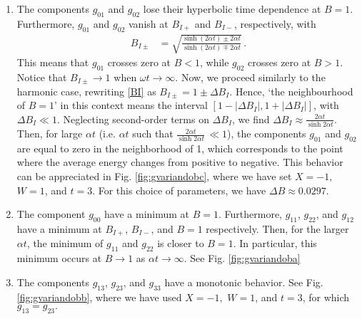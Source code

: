 \documentclass[12pt]{iopart}
\begin{document}
\begin{enumerate}
 \item The components $g_{01}$ and $g_{02}$ lose their hyperbolic time dependence at $B=1$. Furthermore, $g_{01}$ and $g_{02}$ vanish at $B_{I+}$ and $B_{I-}$, respectively, with
    \begin{align} 
    \label{BI}
    B_{I\pm}&=\sqrt{\frac{\sinh\left(2 \alpha t\right)\pm 2\alpha t} {\sinh\left(2 \alpha t\right)\mp 2 \alpha t}}\,.
\end{align}
This means that $g_{01}$ crosses zero at $B<1$, while $g_{02}$ crosses zero at $B>1$. Notice that $B_{I\pm}\to 1$ when $\omega t\to \infty$. Now, we proceed similarly to the harmonic case, rewriting \eqref{BI} as $ B_{I\pm}=1\pm \Delta B_I$. Hence, `the neighbourhood of $B=1$' in this context means the interval $[ 1-|\Delta B_I|,1+|\Delta B_I| ]$, with $\Delta B_I\ll 1$. Neglecting second-order terms on $\Delta B_I$, we find  $\Delta B_I \approx \tfrac{ 2\alpha t}{\sinh 2\alpha t}$. Then, for large $\alpha t$ (i.e. $\alpha t$ such that $\tfrac{ 2\alpha t}{\sinh 2\alpha t} \,\ll 1$), the components $g_{01}$ and $g_{02}$ are equal to zero in the neighborhood of 1, which corresponds to the point where the average energy changes from positive to negative.  This behavior can be appreciated in Fig. \ref{fig:gvariandobc}, where we have set $X=-1,$ $W=1$, and $t=3$.  For this choice of parameters, we have $\Delta B \approx 0.0297.$
  \item  The component $g_{00}$ have a minimum at $B=1$. Furthermore, $g_{11}$, $g_{22}$, and $g_{12}$ have a minimum at $B_{I+}$, $B_{I-}$, and $B=1$ respectively. Then, for the larger $ \alpha t$, the minimum of $g_{11}$ and $g_{22}$ is closer to $B=1$. In particular, this minimum occurs at $B\to 1$ as $\alpha t \to \infty$. See  Fig. \ref{fig:gvariandoba}
    
   \item  The components $g_{13}$, $g_{23}$, and $g_{33}$ have a monotonic behavior. See Fig. \ref{fig:gvariandobb}, where we have used $X=-1,$ $W=1$, and $t=3$, for which $g_{13}=g_{23}.$
\end{enumerate}
\end{document}
